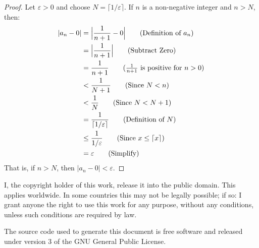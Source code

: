 \documentclass{article}
\theoremstyle{normal}
\theoremstyle{plain}
\newcommand{\ceil}[2][]{#1\lceil#2#1\rceil}
\begin{document}
    \begin{proof}
        Let $\varepsilon>0$ and choose $N=\ceil{1/\varepsilon}$. If $n$ is a
        non-negative integer and $n>N$, then:
        \begin{align}
            |a_{n}-0|&=\Big|\frac{1}{n+1}-0\Big|\tag{Definition of $a_{n}$}\\
                &=\Big|\frac{1}{n+1}\Big|\tag{Subtract Zero}\\
                &=\frac{1}{n+1}\tag{$\frac{1}{n+1}$ is positive for $n>0$}\\
                &<\frac{1}{N+1}\tag{Since $N<n$}\\
                &<\frac{1}{N}\tag{Since $N<N+1$}\\
                &=\frac{1}{\ceil{1/\varepsilon}}\tag{Definition of $N$}\\
                &\leq\frac{1}{1/\varepsilon}\tag{Since $x\leq\ceil{x}$}\\
                &=\varepsilon\tag{Simplify}
        \end{align}
        That is, if $n>N$, then $|a_{n}-0|<\varepsilon$.
    \end{proof}
    \newpage
    I, the copyright holder of this work, release it into the public domain.
    This applies worldwide. In some countries this may not be legally possible;
    if so: I grant anyone the right to use this work for any purpose, without
    any conditions, unless such conditions are required by law.
    \par\hfill\par
    The source code used to generate this document is free software and released
    under version 3 of the GNU General Public License.
\end{document}
